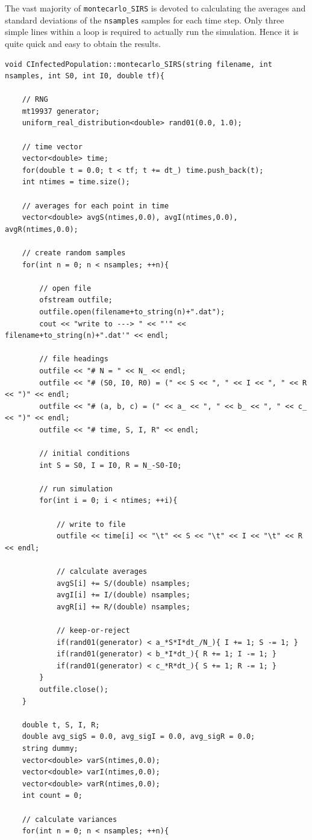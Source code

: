 \documentclass[prb,aps,twocolumn,showpacs,10pt]{revtex4-1}
\begin{document}
The vast majority of \texttt{montecarlo\_SIRS} is devoted to calculating the averages and standard deviations of the \texttt{nsamples} samples for each time step. Only three simple lines within a loop is required to actually run the simulation. Hence it is quite quick and easy to obtain the results.
\begin{lstlisting}
void CInfectedPopulation::montecarlo_SIRS(string filename, int nsamples, int S0, int I0, double tf){

	// RNG
	mt19937 generator;
	uniform_real_distribution<double> rand01(0.0, 1.0);

	// time vector
	vector<double> time;
	for(double t = 0.0; t < tf; t += dt_) time.push_back(t);
	int ntimes = time.size();
	
	// averages for each point in time
	vector<double> avgS(ntimes,0.0), avgI(ntimes,0.0), avgR(ntimes,0.0);

	// create random samples
	for(int n = 0; n < nsamples; ++n){

		// open file
		ofstream outfile;
		outfile.open(filename+to_string(n)+".dat");
		cout << "write to ---> " << "'" << filename+to_string(n)+".dat'" << endl;

		// file headings
		outfile << "# N = " << N_ << endl;
		outfile << "# (S0, I0, R0) = (" << S << ", " << I << ", " << R << ")" << endl;
		outfile << "# (a, b, c) = (" << a_ << ", " << b_ << ", " << c_ << ")" << endl;
		outfile << "# time, S, I, R" << endl;

		// initial conditions
		int S = S0, I = I0, R = N_-S0-I0;

		// run simulation
		for(int i = 0; i < ntimes; ++i){

			// write to file
			outfile << time[i] << "\t" << S << "\t" << I << "\t" << R << endl;
			
			// calculate averages
			avgS[i] += S/(double) nsamples;
			avgI[i] += I/(double) nsamples;
			avgR[i] += R/(double) nsamples;

			// keep-or-reject
			if(rand01(generator) < a_*S*I*dt_/N_){ I += 1; S -= 1; }
			if(rand01(generator) < b_*I*dt_){ R += 1; I -= 1; }
			if(rand01(generator) < c_*R*dt_){ S += 1; R -= 1; }
		}
		outfile.close();
	}

	double t, S, I, R;
	double avg_sigS = 0.0, avg_sigI = 0.0, avg_sigR = 0.0;
	string dummy;
	vector<double> varS(ntimes,0.0);
	vector<double> varI(ntimes,0.0);
	vector<double> varR(ntimes,0.0);
	int count = 0;

	// calculate variances
	for(int n = 0; n < nsamples; ++n){


\end{lstlisting}
\end{document}
